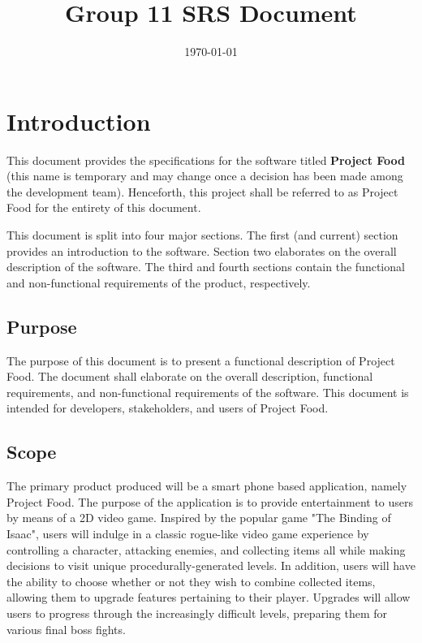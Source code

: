 \documentclass[12pt, titlepage]{article}
\title{Group 11 SRS Document}
\author{}
\date{\today}
\begin{document}
\maketitle

\tableofcontents
\listoftables
\listoffigures

\newpage


\section{Introduction}
This document provides the specifications for the software titled \textbf{Project Food} (this name is temporary and may change once a decision has been made among the development team). Henceforth, this project shall be referred to as Project Food for the entirety of this document.

This document is split into four major sections. The first (and current) section provides an introduction to the software. Section two elaborates on the overall description of the software. The third and fourth sections contain the functional and non-functional requirements of the product, respectively.

  \subsection{Purpose} 
  The purpose of this document is to present a functional description of Project Food. The document shall elaborate on the overall description, functional requirements, and non-functional requirements of the software. This document is intended for developers, stakeholders, and users of Project Food.
  \subsection{Scope}

  The primary product produced will be a smart phone based application, namely Project Food. The purpose of the application is to provide entertainment to users by means of a 2D video game. Inspired by the popular game "The Binding of Isaac", users will indulge in a classic rogue-like video game experience by controlling a character, attacking enemies, and collecting items all while making decisions to visit unique procedurally-generated levels. In addition, users will have the ability to choose whether or not they wish to combine collected items, allowing them to upgrade features pertaining to their player. Upgrades will allow users to progress through the increasingly difficult levels, preparing them for various final boss fights.
\end{document}
